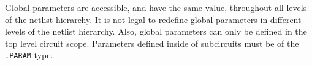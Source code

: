 \begin{Command}
Global parameters are accessible, and have the same value, throughout all
levels of the netlist hierarchy.  It is not legal to redefine global parameters
in different levels of the netlist hierarchy.  Also, global parameters can only 
  be defined in the top level circuit scope.   Parameters defined inside of 
  subcircuits must be of the \texttt{.PARAM} type.

\end{Command}
